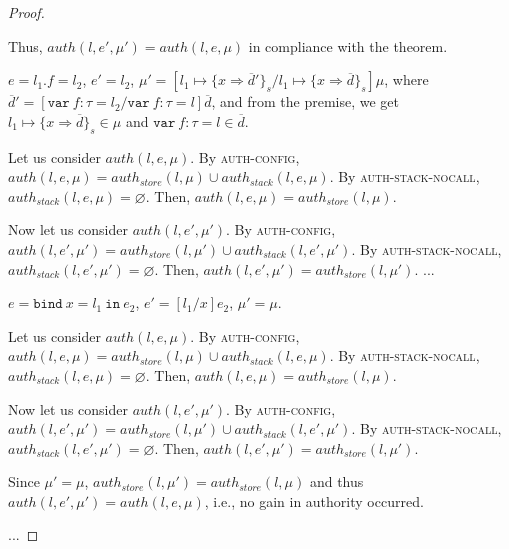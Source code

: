 \documentclass{llncs}
\newcommand{\keywadj}[1]{\mathtt{#1}}
\newcommand{\keyw}[1]{\keywadj{#1}~}
\newcommand{\pcase}[1][]{
  \if\relax\detokenize{#1}\relax
    \def\thiscase{}
  \else
    \def\thiscase{~#1}
  \fi
  \item
}
\begin{document}
\begin{proof}
\begin{pcases}
\begin{enumerate}
Thus, $auth(l, e', \mu') = auth(l, e, \mu)$ in compliance with the theorem.
\\
\end{enumerate}

\pcase[\textsc{E-Assign}]
$e = l_1.f = l_2$, $e' = l_2$, $\mu' = [l_1 \mapsto \{ x \Rightarrow \overline{d}' \}_{s}/l_1 \mapsto \{ x \Rightarrow \overline{d} \}_{s}]\mu$, where $\overline{d}' = [\keyw{var} f:\tau = l_2/\keyw{var} f:\tau = l]\overline{d}$, and from the premise, we get $l_1 \mapsto \{ x \Rightarrow \overline{d} \}_{s} \in \mu$ and $\keyw{var} f:\tau = l \in \overline{d}$.

\hspace{12pt} Let us consider $auth(l, e, \mu)$. By \textsc{auth-config}, $auth(l, e, \mu) = auth_{store}(l, \mu) \cup auth_{stack}(l,e,\mu)$. By \textsc{auth-stack-nocall}, $auth_{stack}(l, e, \mu) = \varnothing$. Then, $auth(l, e, \mu) = auth_{store}(l, \mu)$.

\hspace{12pt} Now let us consider $auth(l, e', \mu')$. By \textsc{auth-config}, $auth(l, e', \mu') = auth_{store}(l, \mu') \cup auth_{stack}(l, e',\mu')$. By \textsc{auth-stack-nocall}, $auth_{stack}(l, e', \mu') = \varnothing$. Then, $auth(l, e', \mu') = auth_{store}(l, \mu')$.
...
\\
\pcase[\textsc{E-Bind}]
$e = \keyw{bind} x = l_1~\keyw{in} e_2$, $e' = [l_1/x]e_2$, $\mu' = \mu$.

\hspace{12pt} Let us consider $auth(l, e, \mu)$. By \textsc{auth-config}, $auth(l, e, \mu) = auth_{store}(l, \mu) \cup auth_{stack}(l,e,\mu)$. By \textsc{auth-stack-nocall}, $auth_{stack}(l, e, \mu) = \varnothing$. Then, $auth(l, e, \mu) = auth_{store}(l, \mu)$.

\hspace{12pt} Now let us consider $auth(l, e', \mu')$. By \textsc{auth-config}, $auth(l, e', \mu') = auth_{store}(l, \mu') \cup auth_{stack}(l, e',\mu')$. By \textsc{auth-stack-nocall}, $auth_{stack}(l, e', \mu') = \varnothing$. Then, $auth(l, e', \mu') = auth_{store}(l, \mu')$.

\hspace{12pt} Since $\mu' = \mu$, $auth_{store}(l, \mu') = auth_{store}(l, \mu)$ and thus $auth(l, e', \mu') = auth(l, e, \mu)$, i.e., no gain in authority occurred.
\\
\end{pcases}

\noindent...
\end{proof}
\end{document}
